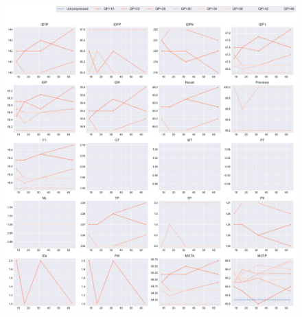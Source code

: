 \begin{figure}[!htbp]
\centering
\includegraphics[width=1.0\linewidth]{img/appendix/Kimono_all_multiplots_msr.pdf}
\caption[Result of all object classes in Class B Kimono with Horizontal Axis of MSR]{}
\label{fig:Kimono_all_msr}
\end{figure}




